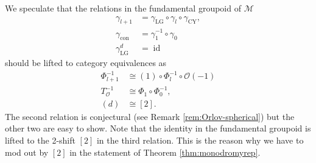 \documentclass[11pt]{amsart}
\theoremstyle{definition} %
\theoremstyle{remark} %
\newcommand{\id}{\operatorname{id}}
\def\MFhom{\operatorname{{MF}}}
\newcommand{\bmu}{\boldsymbol{\mu}}
\newcommand{\cO}{\mathcal{O}}
\newcommand{\cM}{\mathcal{M}}
\newcommand{\tcMo}{\widetilde{\cM}^\circ}
\newcommand{\cE}{\mathcal{E}}
\newcommand{\frs}{\mathfrak{s}}
\newcommand{\CY}{\operatorname{CY}}
\newcommand{\LG}{\operatorname{LG}}
\newcommand{\con}{\operatorname{con}}
\begin{document}

We speculate that the relations in the fundamental groupoid of $\cM$ 
\begin{align*}
\gamma_{l+1} 
& = \gamma_{\LG} \circ \gamma_l \circ \gamma_{\CY}, \\ 
\gamma_{\con} 
& = \gamma_1^{-1} \circ\gamma_0 \\ 
\gamma_{\LG}^d 
& =  \id 
\end{align*}  
should be lifted to category equivalences as 
\begin{align*} 
\Phi_{l+1}^{-1} & \cong  (1)  \circ \Phi_{l}^{-1} \circ \cO(-1)  \\ 
T_\cO^{-1} & \cong \Phi_1 \circ \Phi_0^{-1}, \\ 
(d) & \cong [2].   
\end{align*} 
The second relation is conjectural 
(see Remark \ref{rem:Orlov-spherical}) but the other two 
are easy to show. 
Note that the identity in the fundamental groupoid 
is lifted to the 2-shift $[2]$ 
in the third relation.  
This is the reason why we have to mod out by $[2]$ 
in the statement of Theorem \ref{thm:monodromyrep}. 
\end{document}
